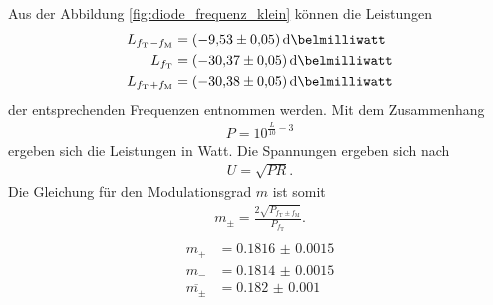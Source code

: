 Aus der Abbildung \ref{fig:diode_frequenz_klein} können die Leistungen
\begin{align}
L_{f_{\text{T}}-f_{\text{M}}}&=\SI{-9.53(5)}{\deci\belmilliwatt} \notag\\
L_{f_{\text{T}}}&=\SI{-30.37(5)}{\deci\belmilliwatt} \\
L_{f_{\text{T}}+f_{\text{M}}}&=\SI{-30.38(5)}{\deci\belmilliwatt} \notag
\end{align}
der entsprechenden Frequenzen entnommen werden.
Mit dem Zusammenhang
\begin{align}
  P=10^{\frac{L}{10}-3} \label{eqn:dbm_in_watt}
\end{align}
ergeben sich die Leistungen in Watt.
Die Spannungen ergeben sich nach
\begin{align}
  U= \sqrt{P R} \label{eqn:leistung_in_spannung}.
\end{align}
Die Gleichung für den Modulationsgrad $m$ ist somit
\begin{align}
m_{\pm}=\frac{2 \sqrt{P_{f_{\text{T}}\pm f_{\text{M}} }}}{P_{f_{\text{T}}}}. \label{eqn:m_leistung}\\
\end{align}
\begin{align*}
m_+ &= \num{0.1816(15)} \\
m_- &= \num{0.1814(15)}  \\
\overline{m_\pm} &= \num{0.182(1)}
\end{align*}

